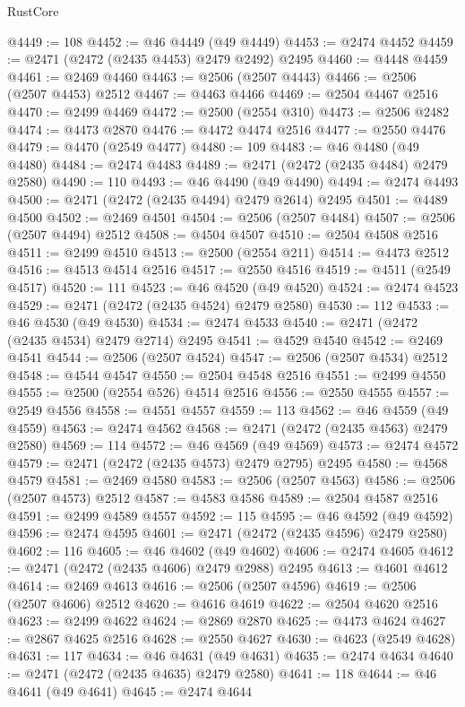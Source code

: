 \begin{lexlean}{RustCore}
\begin{coremodule}
@4449 := 108
@4452 := @46 @4449 (@49 @4449)
@4453 := @2474 @4452
@4459 := @2471 (@2472 (@2435 @4453) @2479 @2492) @2495
@4460 := @4448 @4459
@4461 := @2469 @4460
@4463 := @2506 (@2507 @4443)
@4466 := @2506 (@2507 @4453) @2512
@4467 := @4463 @4466
@4469 := @2504 @4467 @2516
@4470 := @2499 @4469
@4472 := @2500 (@2554 @310)
@4473 := @2506 @2482
@4474 := @4473 @2870
@4476 := @4472 @4474 @2516
@4477 := @2550 @4476
@4479 := @4470 (@2549 @4477)
@4480 := 109
@4483 := @46 @4480 (@49 @4480)
@4484 := @2474 @4483
@4489 := @2471 (@2472 (@2435 @4484) @2479 @2580)
@4490 := 110
@4493 := @46 @4490 (@49 @4490)
@4494 := @2474 @4493
@4500 := @2471 (@2472 (@2435 @4494) @2479 @2614) @2495
@4501 := @4489 @4500
@4502 := @2469 @4501
@4504 := @2506 (@2507 @4484)
@4507 := @2506 (@2507 @4494) @2512
@4508 := @4504 @4507
@4510 := @2504 @4508 @2516
@4511 := @2499 @4510
@4513 := @2500 (@2554 @211)
@4514 := @4473 @2512
@4516 := @4513 @4514 @2516
@4517 := @2550 @4516
@4519 := @4511 (@2549 @4517)
@4520 := 111
@4523 := @46 @4520 (@49 @4520)
@4524 := @2474 @4523
@4529 := @2471 (@2472 (@2435 @4524) @2479 @2580)
@4530 := 112
@4533 := @46 @4530 (@49 @4530)
@4534 := @2474 @4533
@4540 := @2471 (@2472 (@2435 @4534) @2479 @2714) @2495
@4541 := @4529 @4540
@4542 := @2469 @4541
@4544 := @2506 (@2507 @4524)
@4547 := @2506 (@2507 @4534) @2512
@4548 := @4544 @4547
@4550 := @2504 @4548 @2516
@4551 := @2499 @4550
@4555 := @2500 (@2554 @526) @4514 @2516
@4556 := @2550 @4555
@4557 := @2549 @4556
@4558 := @4551 @4557
@4559 := 113
@4562 := @46 @4559 (@49 @4559)
@4563 := @2474 @4562
@4568 := @2471 (@2472 (@2435 @4563) @2479 @2580)
@4569 := 114
@4572 := @46 @4569 (@49 @4569)
@4573 := @2474 @4572
@4579 := @2471 (@2472 (@2435 @4573) @2479 @2795) @2495
@4580 := @4568 @4579
@4581 := @2469 @4580
@4583 := @2506 (@2507 @4563)
@4586 := @2506 (@2507 @4573) @2512
@4587 := @4583 @4586
@4589 := @2504 @4587 @2516
@4591 := @2499 @4589 @4557
@4592 := 115
@4595 := @46 @4592 (@49 @4592)
@4596 := @2474 @4595
@4601 := @2471 (@2472 (@2435 @4596) @2479 @2580)
@4602 := 116
@4605 := @46 @4602 (@49 @4602)
@4606 := @2474 @4605
@4612 := @2471 (@2472 (@2435 @4606) @2479 @2988) @2495
@4613 := @4601 @4612
@4614 := @2469 @4613
@4616 := @2506 (@2507 @4596)
@4619 := @2506 (@2507 @4606) @2512
@4620 := @4616 @4619
@4622 := @2504 @4620 @2516
@4623 := @2499 @4622
@4624 := @2869 @2870
@4625 := @4473 @4624
@4627 := @2867 @4625 @2516
@4628 := @2550 @4627
@4630 := @4623 (@2549 @4628)
@4631 := 117
@4634 := @46 @4631 (@49 @4631)
@4635 := @2474 @4634
@4640 := @2471 (@2472 (@2435 @4635) @2479 @2580)
@4641 := 118
@4644 := @46 @4641 (@49 @4641)
@4645 := @2474 @4644

\end{coremodule}
\end{lexlean}

